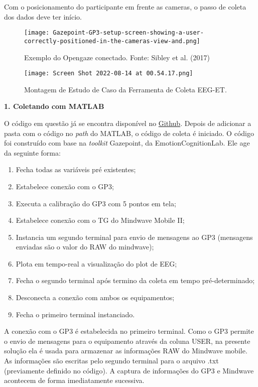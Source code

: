 Com o posicionamento do participante em frente as cameras, o passo de coleta dos dados deve ter início. 

\begin{figure}[!h]
    \texttt{[image: Gazepoint-GP3-setup-screen-showing-a-user-correctly-positioned-in-the-cameras-view-and.png]}
    \caption{Exemplo do Opengaze conectado. Fonte: Sibley et al. (2017)}
\end{figure}



\begin{figure}
    \centering
    \texttt{[image: Screen Shot 2022-08-14 at 00.54.17.png]}
    \caption{Montagem de Estudo de Caso da Ferramenta de Coleta EEG-ET.}
\end{figure}







\textbf{1. Coletando com MATLAB}

O código em questão já se encontra disponível no \href{https://github.com/anapaulasandes/ppgeb_masters}{Github}.
Depois de adicionar a pasta com o código no \textit{path} do MATLAB, o código de coleta é
iniciado. O código foi construído com base na \textit{toolkit} Gazepoint, da EmotionCognitionLab. 
Ele age da seguinte forma:

\begin{enumerate}
    \item Fecha todas as variáveis pré existentes;
    \item Estabelece conexão com o GP3;
    \item Executa a calibração do GP3 com 5 pontos em tela;
    \item Estabelece conexão com o TG do Mindwave Mobile II;
    \item Instancia um segundo terminal para envio de mensagens ao GP3 (mensagens enviadas são o valor do RAW do mindwave);
    \item Plota em tempo-real a visualização do plot de EEG;
    \item Fecha o segundo terminal após termino da coleta em tempo pré-determinado;
    \item Desconecta a conexão com ambos os equipamentos;
    \item Fecha o primeiro terminal instanciado.
\end{enumerate}

 A conexão com o GP3 é estabelecida no primeiro terminal. Como o GP3 permite 
 o envio de mensagens para o equipamento através da coluna USER, na presente solução ela é
 usada para armazenar as informações RAW do Mindwave mobile. As informações são escritas 
 pelo segundo terminal para o arquivo .txt (previamente definido no código). A captura de informações 
 do GP3 e Mindwave acontecem de forma imediatamente sucessiva. 